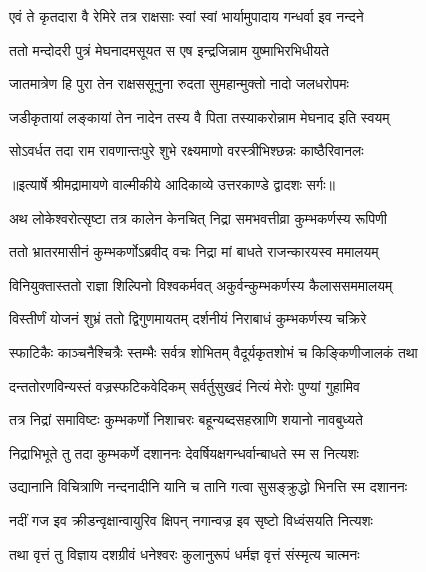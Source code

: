 \twolineshloka
{एवं ते कृतदारा वै रेमिरे तत्र राक्षसाः}
{स्वां स्वां भार्यामुपादाय गन्धर्वा इव नन्दने} %

\twolineshloka
{ततो मन्दोदरी पुत्रं मेघनादमसूयत}
{स एष इन्द्रजिन्नाम युष्माभिरभिधीयते} %

\twolineshloka
{जातमात्रेण हि पुरा तेन राक्षससूनुना}
{रुदता सुमहान्मुक्तो नादो जलधरोपमः} %

\twolineshloka
{जडीकृतायां लङ्कायां तेन नादेन तस्य वै}
{पिता तस्याकरोन्नाम मेघनाद इति स्वयम्} %

\twolineshloka
{सोऽवर्धत तदा राम रावणान्तःपुरे शुभे}
{रक्ष्यमाणो वरस्त्रीभिश्छन्नः काष्ठैरिवानलः} %


{॥इत्यार्षे श्रीमद्रामायणे वाल्मीकीये आदिकाव्ये उत्तरकाण्डे द्वादशः सर्गः॥}


\twolineshloka
{अथ लोकेश्वरोत्सृष्टा तत्र कालेन केनचित्}
{निद्रा समभवत्तीव्रा कुम्भकर्णस्य रूपिणी} %

\twolineshloka
{ततो भ्रातरमासीनं कुम्भकर्णोऽब्रवीद् वचः}
{निद्रा मां बाधते राजन्कारयस्व ममालयम्} %

\twolineshloka
{विनियुक्तास्ततो राज्ञा शिल्पिनो विश्वकर्मवत्}
{अकुर्वन्कुम्भकर्णस्य कैलाससममालयम्} %

\twolineshloka
{विस्तीर्णं योजनं शुभ्रं ततो द्विगुणमायतम्}
{दर्शनीयं निराबाधं कुम्भकर्णस्य चक्रिरे} %

\twolineshloka
{स्फाटिकैः काञ्चनैश्चित्रैः स्तम्भैः सर्वत्र शोभितम्}
{वैदूर्यकृतशोभं च किङ्किणीजालकं तथा} %

\twolineshloka
{दन्ततोरणविन्यस्तं वज्रस्फटिकवेदिकम्}
{सर्वर्तुसुखदं नित्यं मेरोः पुण्यां गुहामिव} %

\twolineshloka
{तत्र निद्रां समाविष्टः कुम्भकर्णो निशाचरः}
{बहून्यब्दसहस्राणि शयानो नावबुध्यते} %

\twolineshloka
{निद्राभिभूते तु तदा कुम्भकर्णे दशाननः}
{देवर्षियक्षगन्धर्वान्बाधते स्म स नित्यशः} %

\twolineshloka
{उद्यानानि विचित्राणि नन्दनादीनि यानि च}
{तानि गत्वा सुसङ्क्रुद्धो भिनत्ति स्म दशाननः} %

\twolineshloka
{नदीं गज इव क्रीडन्वृक्षान्वायुरिव क्षिपन्}
{नगान्वज्र इव सृष्टो विध्वंसयति नित्यशः} %

\twolineshloka
{तथा वृत्तं तु विज्ञाय दशग्रीवं धनेश्वरः}
{कुलानुरूपं धर्मज्ञ वृत्तं संस्मृत्य चात्मनः} %


